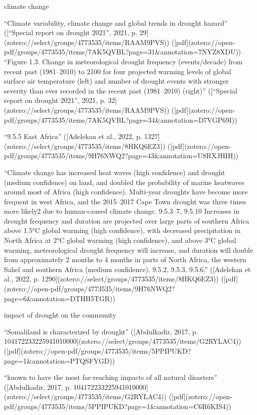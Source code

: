 climate change

“Climate variability, climate change and global trends in drought hazard” ([“Special report on drought 2021”, 2021, p. 29](zotero://select/groups/4773535/items/RAAM9PVS)) ([pdf](zotero://open-pdf/groups/4773535/items/7AK5QVBL?page=31&annotation=7NYZ8XDU))
“Figure 1.3. Change in meteorological drought frequency (events/decade) from recent past (1981–2010) to 2100 for four projected warming levels of global surface air temperature (left) and number of drought events with stronger severity than ever recorded in the recent past (1981–2010) (right)” ([“Special report on drought 2021”, 2021, p. 32](zotero://select/groups/4773535/items/RAAM9PVS)) ([pdf](zotero://open-pdf/groups/4773535/items/7AK5QVBL?page=34&annotation=D7VGP69I))

“9.5.5 East Africa” ([Adelekan et al., 2022, p. 1327](zotero://select/groups/4773535/items/8HKQ6EZ3)) ([pdf](zotero://open-pdf/groups/4773535/items/9H76NWQ2?page=43&annotation=U8RXJHIH))

“Climate change has increased heat waves (high confidence) and drought (medium confidence) on land, and doubled the probability of marine heatwaves around most of Africa (high confidence). Multi-year droughts have become more frequent in west Africa, and the 2015–2017 Cape Town drought was three times more likely2 due to human-caused climate change. {9.5.3–7, 9.5.10} Increases in drought frequency and duration are projected over large parts of southern Africa above 1.5°C global warming (high confidence), with decreased precipitation in North Africa at 2°C global warming (high confidence), and above 3°C global warming, meteorological drought frequency will increase, and duration will double from approximately 2 months to 4 months in parts of North Africa, the western Sahel and southern Africa (medium confidence). {9.5.2, 9.5.3, 9.5.6.}” ([Adelekan et al., 2022, p. 1290](zotero://select/groups/4773535/items/8HKQ6EZ3)) ([pdf](zotero://open-pdf/groups/4773535/items/9H76NWQ2?page=6&annotation=DTHH5TGR))



impact of drought on the community

“Somaliland is characterized by drought” ([Abdulkadir, 2017, p. 104172233225941010000](zotero://select/groups/4773535/items/G2RYLAC4)) ([pdf](zotero://open-pdf/groups/4773535/items/5PPIPUKD?page=1&annotation=PTQSFYGD))

“known to have the most far-reaching impacts of all natural disasters” ([Abdulkadir, 2017, p. 104172233225941010000](zotero://select/groups/4773535/items/G2RYLAC4)) ([pdf](zotero://open-pdf/groups/4773535/items/5PPIPUKD?page=1&annotation=C6R6KIS4))

